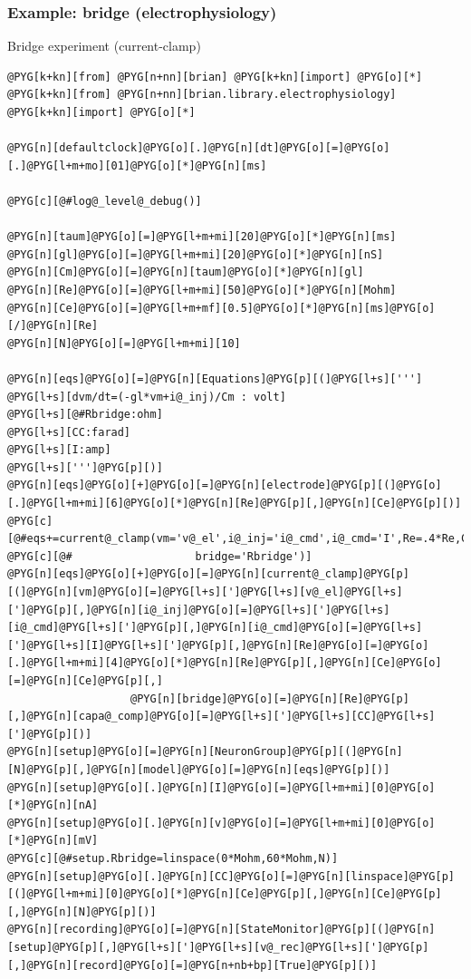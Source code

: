 \documentclass[letterpaper,10pt,english]{manual}
\begin{document}
\hypertarget{index-25}{}\subsubsection{Example: bridge (electrophysiology)}

Bridge experiment (current-clamp)

\begin{Verbatim}[commandchars=@\[\]]
@PYG[k+kn][from] @PYG[n+nn][brian] @PYG[k+kn][import] @PYG[o][*]
@PYG[k+kn][from] @PYG[n+nn][brian.library.electrophysiology] @PYG[k+kn][import] @PYG[o][*]

@PYG[n][defaultclock]@PYG[o][.]@PYG[n][dt]@PYG[o][=]@PYG[o][.]@PYG[l+m+mo][01]@PYG[o][*]@PYG[n][ms]

@PYG[c][@#log@_level@_debug()]

@PYG[n][taum]@PYG[o][=]@PYG[l+m+mi][20]@PYG[o][*]@PYG[n][ms]
@PYG[n][gl]@PYG[o][=]@PYG[l+m+mi][20]@PYG[o][*]@PYG[n][nS]
@PYG[n][Cm]@PYG[o][=]@PYG[n][taum]@PYG[o][*]@PYG[n][gl]
@PYG[n][Re]@PYG[o][=]@PYG[l+m+mi][50]@PYG[o][*]@PYG[n][Mohm]
@PYG[n][Ce]@PYG[o][=]@PYG[l+m+mf][0.5]@PYG[o][*]@PYG[n][ms]@PYG[o][/]@PYG[n][Re]
@PYG[n][N]@PYG[o][=]@PYG[l+m+mi][10]

@PYG[n][eqs]@PYG[o][=]@PYG[n][Equations]@PYG[p][(]@PYG[l+s][''']
@PYG[l+s][dvm/dt=(-gl*vm+i@_inj)/Cm : volt]
@PYG[l+s][@#Rbridge:ohm]
@PYG[l+s][CC:farad]
@PYG[l+s][I:amp]
@PYG[l+s][''']@PYG[p][)]
@PYG[n][eqs]@PYG[o][+]@PYG[o][=]@PYG[n][electrode]@PYG[p][(]@PYG[o][.]@PYG[l+m+mi][6]@PYG[o][*]@PYG[n][Re]@PYG[p][,]@PYG[n][Ce]@PYG[p][)]
@PYG[c][@#eqs+=current@_clamp(vm='v@_el',i@_inj='i@_cmd',i@_cmd='I',Re=.4*Re,Ce=Ce,]
@PYG[c][@#                   bridge='Rbridge')]
@PYG[n][eqs]@PYG[o][+]@PYG[o][=]@PYG[n][current@_clamp]@PYG[p][(]@PYG[n][vm]@PYG[o][=]@PYG[l+s][']@PYG[l+s][v@_el]@PYG[l+s][']@PYG[p][,]@PYG[n][i@_inj]@PYG[o][=]@PYG[l+s][']@PYG[l+s][i@_cmd]@PYG[l+s][']@PYG[p][,]@PYG[n][i@_cmd]@PYG[o][=]@PYG[l+s][']@PYG[l+s][I]@PYG[l+s][']@PYG[p][,]@PYG[n][Re]@PYG[o][=]@PYG[o][.]@PYG[l+m+mi][4]@PYG[o][*]@PYG[n][Re]@PYG[p][,]@PYG[n][Ce]@PYG[o][=]@PYG[n][Ce]@PYG[p][,]
                   @PYG[n][bridge]@PYG[o][=]@PYG[n][Re]@PYG[p][,]@PYG[n][capa@_comp]@PYG[o][=]@PYG[l+s][']@PYG[l+s][CC]@PYG[l+s][']@PYG[p][)]
@PYG[n][setup]@PYG[o][=]@PYG[n][NeuronGroup]@PYG[p][(]@PYG[n][N]@PYG[p][,]@PYG[n][model]@PYG[o][=]@PYG[n][eqs]@PYG[p][)]
@PYG[n][setup]@PYG[o][.]@PYG[n][I]@PYG[o][=]@PYG[l+m+mi][0]@PYG[o][*]@PYG[n][nA]
@PYG[n][setup]@PYG[o][.]@PYG[n][v]@PYG[o][=]@PYG[l+m+mi][0]@PYG[o][*]@PYG[n][mV]
@PYG[c][@#setup.Rbridge=linspace(0*Mohm,60*Mohm,N)]
@PYG[n][setup]@PYG[o][.]@PYG[n][CC]@PYG[o][=]@PYG[n][linspace]@PYG[p][(]@PYG[l+m+mi][0]@PYG[o][*]@PYG[n][Ce]@PYG[p][,]@PYG[n][Ce]@PYG[p][,]@PYG[n][N]@PYG[p][)]
@PYG[n][recording]@PYG[o][=]@PYG[n][StateMonitor]@PYG[p][(]@PYG[n][setup]@PYG[p][,]@PYG[l+s][']@PYG[l+s][v@_rec]@PYG[l+s][']@PYG[p][,]@PYG[n][record]@PYG[o][=]@PYG[n+nb+bp][True]@PYG[p][)]


\end{Verbatim}
\end{document}
